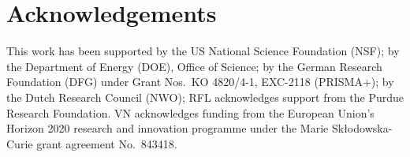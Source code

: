 
\section{Acknowledgements}

This work has been supported 
by the US National Science Foundation (NSF);
by the Department of Energy (DOE), Office of Science;
by the German Research Foundation (DFG) under Grant Nos.~KO 4820/4-1, EXC-2118 (PRISMA+);
by the Dutch Research Council (NWO);
RFL acknowledges support from the Purdue Research Foundation.
VN acknowledges funding from the European Union's Horizon 2020 research and innovation programme under the Marie Sk\l{}odowska-Curie grant agreement No.~843418. 


